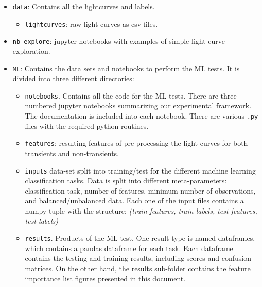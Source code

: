\documentclass[a4paper,fleqn,usenatbib]{mnras}
\begin{document}
\begin{itemize}

\item \texttt{data}: Contains all the lightcurves and labels. 
  \begin{itemize}
  \item \texttt{lightcurves}: raw light-curves as csv files.
  \end{itemize}

\item \texttt{nb-explore}: jupyter notebooks with examples of simple
  light-curve exploration.

\item{\texttt{ML}}: Contains the data sets and notebooks to perform the ML
  tests. It is divided into three different directories:
\begin{itemize}
\item \texttt{notebooks}. Contains all the code for the ML tests. 
  There are three numbered jupyter notebooks summarizing our
  experimental framework.  
  The documentation is included into each notebook.
  There are various \texttt{.py} files with the required python
  routines. 
\item \texttt{features}:  resulting features of pre-processing the
light curves for both transients and non-transients. 
\item \texttt{inputs} data-set split into training/test for the
  different machine learning classification tasks. 
  Data is split into different meta-parameters:
  classification task, number of features, minimum number of
  observations, and balanced/unbalanced data. 
  Each one of the input files contains a numpy tuple with the
  structure: \textit{(train features, train labels, test features,
    test labels)}  
\item \texttt{results}. Products of the ML test. 
  One result type is named dataframes, which contains a pandas
  dataframe for each task. 
  Each dataframe contains the testing and
  training results, including scores and confusion matrices.  
  On the other hand, the results sub-folder contains the feature
  importance list figures presented in this document.  
\end{itemize}
\end{itemize}




\end{document}
